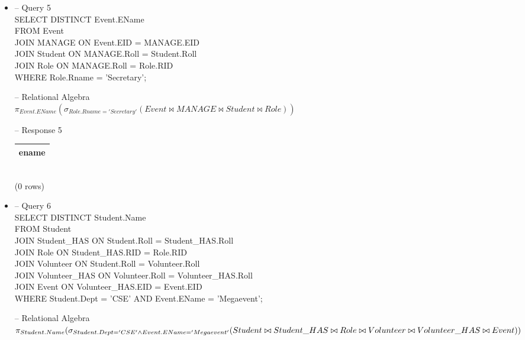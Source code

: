 \documentclass[7pt]{article}
\begin{document}
\begin{itemize}
    \newpage

    \item -- Query 5 \\
    SELECT DISTINCT Event.EName \\
    FROM Event  \\
    JOIN MANAGE ON Event.EID = MANAGE.EID   \\
    JOIN Student ON MANAGE.Roll = Student.Roll  \\
    JOIN Role ON MANAGE.Roll = Role.RID \\
    WHERE Role.Rname = 'Secretary';     \vspace{2pt}

    -- Relational Algebra \\
    $\pi_{Event.EName}(\sigma_{Role.Rname = 'Secretary'}(Event \bowtie MANAGE \bowtie Student \bowtie Role))$ \vspace{2pt}

    -- Response 5 \\
    \begin{tabular}{|c|}
        \hline
        ename \\
        \hline
    \end{tabular} \\
    (0 rows)

    \item -- Query 6 \\
    SELECT DISTINCT Student.Name    \\
    FROM Student    \\
    JOIN Student\_HAS ON Student.Roll = Student\_HAS.Roll \\
    JOIN Role ON Student\_HAS.RID = Role.RID \\
    JOIN Volunteer ON Student.Roll = Volunteer.Roll \\
    JOIN Volunteer\_HAS ON Volunteer.Roll = Volunteer\_HAS.Roll   \\
    JOIN Event ON Volunteer\_HAS.EID = Event.EID \\
    WHERE Student.Dept = 'CSE' AND Event.EName = 'Megaevent';   \vspace{2pt}

    -- Relational Algebra \\
    $\pi_{Student.Name}(\sigma_{Student.Dept = 'CSE' \wedge Event.EName = 'Megaevent'}(Student \bowtie Student\_HAS \bowtie Role \bowtie Volunteer \bowtie \\ Volunteer\_HAS \bowtie Event))$ \vspace{2pt}


\end{itemize}
\end{document}
